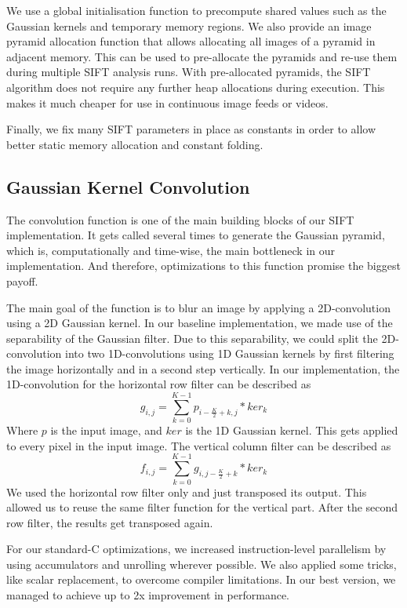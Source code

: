 \documentclass[letterpaper]{article}
\begin{document}
We use a global initialisation function to precompute shared values such as the Gaussian kernels and temporary memory regions. We also provide an image pyramid allocation function that allows allocating all images of a pyramid in adjacent memory. This can be used to pre-allocate the pyramids and re-use them during multiple SIFT analysis runs. With pre-allocated pyramids, the SIFT algorithm does not require any further heap allocations during execution. This makes it much cheaper for use in continuous image feeds or videos.

Finally, we fix many SIFT parameters in place as constants in order to allow better static memory allocation and constant folding.

\subsection*{Gaussian Kernel Convolution}\label{sec:convolution}
The convolution function is one of the main building blocks of our SIFT implementation. It gets called several times to generate the Gaussian pyramid, which is, computationally and time-wise, the main bottleneck in our implementation. And therefore, optimizations to this function promise the biggest payoff.

The main goal of the function is to blur an image by applying a 2D-convolution using a 2D Gaussian kernel. In our baseline implementation, we made use of the separability of the Gaussian filter. Due to this separability, we could split the 2D-convolution into two 1D-convolutions using 1D Gaussian kernels by first filtering the image horizontally and in a second step vertically. In our implementation, the 1D-convolution for the horizontal row filter can be described as
\begin{equation}\label{eq_h}
    g_{i,j} = \sum_{k=0}^{K-1} p_{i-\frac{K}{2}+k,j} * ker_{k}
\end{equation}
Where $p$ is the input image, and $ker$ is the 1D Gaussian kernel. This gets applied to every pixel in the input image. The vertical column filter can be described as
\begin{equation}\label{eq_v}
    f_{i,j} = \sum_{k=0}^{K-1} g_{i,j-\frac{K}{2}+k} * ker_{k}
\end{equation}
We used the horizontal row filter only and just transposed its output. This allowed us to reuse the same filter function for the vertical part. After the second row filter, the results get transposed again.

For our standard-C optimizations, we increased instruction-level parallelism by using accumulators and unrolling wherever possible. We also applied some tricks, like scalar replacement, to overcome compiler limitations. In our best version, we managed to achieve up to 2x improvement in performance.
\end{document}
